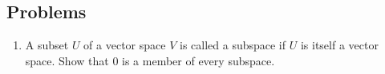 \subsection{Problems}
\begin{enumerate}
\item A subset $U$ of a vector space $V$ is called a subspace if $U$ is itself
a vector space. Show that $0$ is a member of every subspace.
\end{enumerate}




